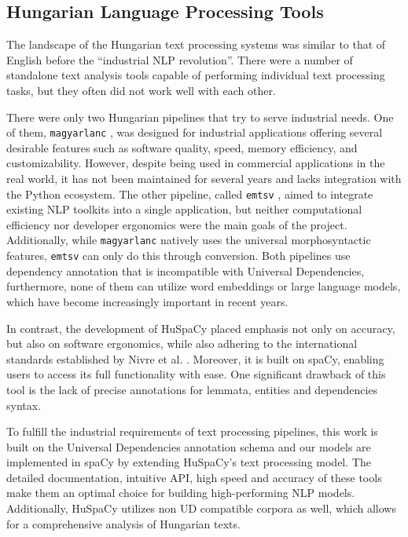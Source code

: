 \documentclass[runningheads,a4paper]{llncs}
\newcommand{\spacy}{spaCy}
\newcommand{\huspacy}{HuSpaCy}
\newcommand{\emtsv}{\texttt{emtsv}}
\newcommand{\magyarlanc}{\texttt{magyarlanc}}
\newcommand{\universaldependencies}{Universal Dependencies}
\begin{document}
\subsection{Hungarian Language Processing Tools}  \label{sec:background:hunlp}

The landscape of the Hungarian text processing systems was similar to that of English before the ``industrial NLP revolution''. There were a number of standalone text analysis tools \cite{metanet} capable of performing individual text processing tasks, but they often did not work well with each other.

There were only two Hungarian pipelines that try to serve industrial needs. One of them, \magyarlanc{} \cite{magyaralanc}, was designed for industrial applications offering several desirable features such as software quality, speed, memory efficiency, and customizability. However, despite being used in commercial applications in the real world, it has not been maintained for several years and lacks integration with the Python ecosystem. The other pipeline, called \emtsv{} \cite{emtsv1,emtsv2,emtsv4}, aimed to integrate existing NLP toolkits into a single application, but neither computational efficiency nor developer ergonomics were the main goals of the project. Additionally, while \magyarlanc{} natively uses the universal morphosyntactic features, \emtsv{} can only do this through conversion. Both pipelines use dependency annotation that is incompatible with \universaldependencies, furthermore, none of them can utilize word embeddings or large language models, which have become increasingly important in recent years.

In contrast, the development of \huspacy{} placed emphasis not only on accuracy, but also on software ergonomics, while also adhering to the international standards established by Nivre et al. \cite{nivre-etal-2020-universal}. Moreover, it is built on \spacy, enabling users to access its full functionality with ease. One significant drawback of this tool is the lack of precise annotations for lemmata, entities and dependencies syntax.

To fulfill the industrial requirements of text processing pipelines, this work is built on the \universaldependencies{} annotation schema and our models are implemented in \spacy{} by extending \huspacy’s text processing model. The detailed documentation, intuitive API, high speed and accuracy of these tools make them an optimal choice for building high-performing NLP models. Additionally, \huspacy{} utilizes non UD compatible corpora as well, which allows for a comprehensive analysis of Hungarian texts. 
\end{document}
